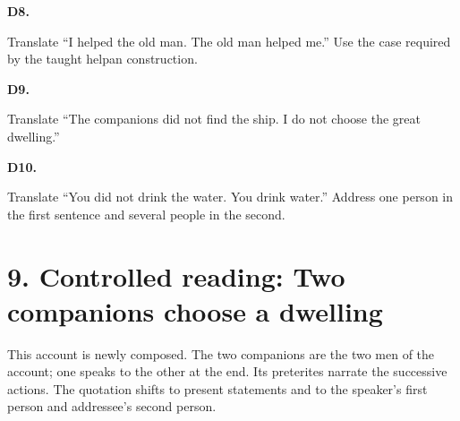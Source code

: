 \par\begin{minipage}{\linewidth}\raggedright
\textbf{D8.}

Translate “I helped the old man. The old man helped me.” Use the case required by the taught helpan construction.

\end{minipage}\par\addvspace{4pt}

\par\begin{minipage}{\linewidth}\raggedright
\textbf{D9.}

Translate “The companions did not find the ship. I do not choose the great dwelling.”

\end{minipage}\par\addvspace{4pt}

\par\begin{minipage}{\linewidth}\raggedright
\textbf{D10.}

Translate “You did not drink the water. You drink water.” Address one person in the first sentence and several people in the second.

\end{minipage}\par\addvspace{4pt}

\section*{9. Controlled reading: Two companions choose a dwelling}

This account is newly composed. The two companions are the two men of the account; one speaks to the other at the end. Its preterites narrate the successive actions. The quotation shifts to present statements and to the speaker’s first person and addressee’s second person.

